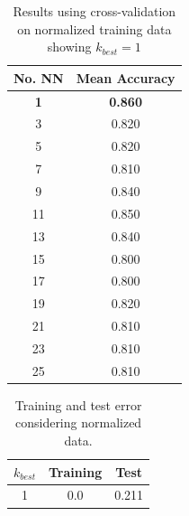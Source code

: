 \documentclass[12pt]{article}
\begin{document}
  \begin{table}[h]
    \centering
    \begin{tabular}{| c | c |}
      \hline
        No. NN & Mean Accuracy \\
      \hline
        \textbf{1} &  \textbf{0.860} \\
        3 &  0.820 \\
        5 &  0.820 \\
        7 &  0.810 \\
        9 &  0.840 \\
        11 & 0.850  \\
        13 & 0.840  \\
        15 & 0.800  \\
        17 & 0.800  \\
        19 & 0.820  \\
        21 & 0.810  \\
        23 & 0.810  \\
        25 & 0.810  \\
      \hline
    \end{tabular}
    \caption{Results using cross-validation on normalized training data showing $k_{best} = 1$}
    \label{table:norm-cross-validation}
  \end{table}

  \begin{table}[h]
    \centering
    \begin{tabular}{| c | c | c |}
      \hline
        $k_{best}$ & Training & Test \\
      \hline
        1 & 0.0 & 0.211 \\
      \hline
    \end{tabular}
    \caption{Training and test error considering normalized data.}
    \label{table:error_train_test_norm}
  \end{table}
\end{document}
